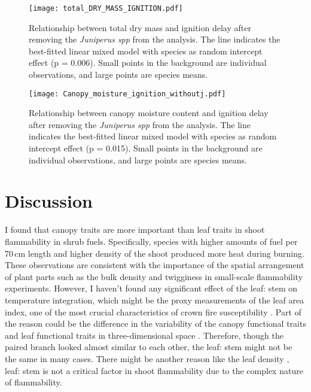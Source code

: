 \documentclass[12pt]{report}
\begin{document}
\begin{figure}
    \centering
    \texttt{[image: total\_DRY\_MASS\_IGNITION.pdf]}
    \caption{Relationship between total dry mass and ignition delay after removing the \emph{Juniperus spp} from the analysis. The line indicates the best-fitted linear mixed model with species as random intercept effect (p = 0.006). Small points in the background are individual observations, and large points are species means.}
\end{figure}

\begin{figure}
    \centering
    \texttt{[image: Canopy\_moisture\_ignition\_withoutj.pdf]}
    \caption{Relationship between canopy moisture content and ignition delay after removing the \emph{Juniperus spp} from the analysis. The line indicates the best-fitted linear mixed model with species as random intercept effect (p = 0.015). Small points in the background are individual observations, and large points are species means.}

\end{figure}


\section{Discussion}

I found that canopy traits are more important than leaf traits in shoot flammability in shrub fuels.
Specifically, species with higher amounts of fuel per 70\,cm length and higher density of the shoot produced more heat during burning. These observations are consistent with the importance of the spatial arrangement of plant parts such as the bulk density \citep{pausas2012fire} and twigginess \citep{potts2022growth} in small-scale flammability experiments. However, I haven't found any significant effect of the leaf: stem on temperature integration, which might be the proxy measurements of the leaf area index, one of the most crucial characteristics of crown fire susceptibility \citep{ray2005micrometeorological}. Part of the reason could be the difference in the variability of the canopy functional traits and leaf functional traits in three-dimensional space \citep{kamoske2021leaf}. Therefore, though the paired branch looked almost similar to each other, the leaf: stem might not be the same in many cases. There might be another reason like the leaf density \citep{potts2022growth}, leaf: stem is not a critical factor in shoot flammability due to the complex nature of flammability.
\end{document}
